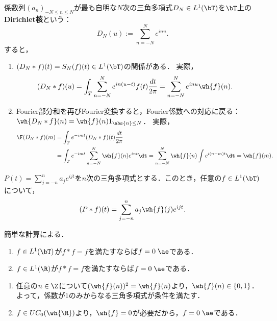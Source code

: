 \documentclass[uplatex,dvipdfmx]{jsreport}
\begin{document}
\begin{example}[Fourier部分和はDirichlet核との畳み込みである]
    係数列$(a_n)_{-N\le n\le N}$が最も自明な$N$次の三角多項式$D_N\in L^1(\bT)$を$\bT$上の\textbf{Dirichlet核}という：
    \[D_N(u):=\sum_{n=-N}^Ne^{inu}.\]
    すると，
    \begin{enumerate}
        \item $(D_N*f)(t)=S_N(f)(t)\in L^1(\bT)$の関係がある．
        実際，
        \begin{align*}
            (D_N*f)(u)&=\int_T\sum_{n=-N}^Ne^{in(u-t)}f(t)\frac{dt}{2\pi}=\sum_{n=-N}^Ne^{inu}\wh{f}(n).
        \end{align*}
        \item Fourier部分和を再びFourier変換すると，Fourier係数への対応に戻る：
        $\wh{D_N*f}(n)=\wh{f}(n)1_{\abs{n}\le N}$．
        実際，
        \begin{align*}
            \F(D_N*f)(m)&=\int_Te^{-imt}(D_N*f)(t)\frac{dt}{2\pi}\\
            &=\int_Te^{-imt}\sum_{n=-N}^N\wh{f}(n)e^{int}\dt
            =\sum_{n=-N}^N\wh{f}(n)\int e^{i(n-m)t}\dt=\wh{f}(m).
        \end{align*}
    \end{enumerate}
\end{example}

\begin{proposition}[三角多項式との畳み込みは三角多項式である]
    $P(t)=\sum_{j=-n}^na_je^{ijt}$を$n$次の三角多項式とする．このとき，任意の$f\in L^1(\bT)$について，
    \[(P*f)(t)=\sum_{j=-n}^na_j\wh{f}(j)e^{ijt}.\]
\end{proposition}
\begin{Proof}
    簡単な計算による．
\end{Proof}

\begin{proposition}[冪零元はただ一つである]\mbox{}
    \begin{enumerate}
        \item $f\in L^1(\bT)$が$f*f=f$を満たすならば$f=0\;\ae$である．
        \item $f\in L^1(\R)$が$f*f=f$を満たすならば$f=0\;\ae$である．
    \end{enumerate}
\end{proposition}
\begin{Proof}\mbox{}
    \begin{enumerate}
        \item 任意の$n\in\Z$について$(\wh{f}(n))^2=\wh{f}(n)$より，$\wh{f}(n)\in\{0,1\}$．
        よって，係数が$1$のみからなる三角多項式が条件を満たす．
        \item $f\in UC_0(\wh{\R})$より，$\wh{f}=0$が必要だから，$f=0\;\ae$である．
    \end{enumerate}
\end{Proof}
\end{document}
